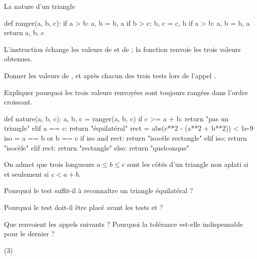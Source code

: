 \begin{exercice}[3]{La nature d'un triangle}
\begin{codecote}[0.36]
\begin{pythoncol}
def ranger(a, b, c):
    if a > b:
        a, b = b, a
    if b > c:
        b, c = c, b
    if a > b:
        a, b = b, a
    return a, b, c
\end{pythoncol}
\cote
L'instruction  échange les valeurs de  et de  ; la fonction renvoie les trois valeurs obtenues.
\begin{questions}
  \item Donner les valeurs de ,  et  après chacun des trois tests lors de l'appel .
  \item Expliquer pourquoi les trois valeurs renvoyées sont toujours rangées dans l'ordre croissant.
\end{questions}
\end{codecote}
\begin{codecote}[0.58]
\begin{pythoncol}
def nature(a, b, c):
    a, b, c = ranger(a, b, c)
    if c >= a + b:
        return "pas un triangle"
    elif a == c:
        return "équilatéral"
    rect = abs(c**2 - (a**2 + b**2)) < 1e-9
    iso = a == b or b == c
    if iso and rect:
        return "isocèle rectangle"
    elif iso:
        return "isocèle"
    elif rect:
        return "rectangle"
    else:
        return "quelconque"
\end{pythoncol}
\cote
On admet que trois longueurs $a\leq b\leq c$ sont les côtés d'un triangle non aplati si et seulement si $c<a+b$.
\begin{questions}[start=3]
  \item Pourquoi le test  suffit-il à reconnaître un triangle équilatéral ?
  \item Pourquoi le test  doit-il être placé avant les tests  et  ?
\end{questions}
\end{codecote}
\begin{questions}[start=5]
  \item Que renvoient les appels suivants ? Pourquoi la tolérance est-elle indispensable pour le dernier ?
\begin{tasks}[label=\alph*)](3)
  \task {}
  \task {}
  \task {}
  \task {}
  \task {}
  \task {}
\end{tasks}
\end{questions}
\end{exercice}
